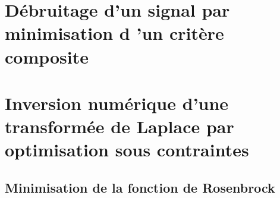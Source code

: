 \documentclass[12pt,a4paper,titlepage]{article}
\begin{document}
\section{Débruitage d’un signal par minimisation d ’un critère composite}

\newpage
\section{Inversion numérique d’une transformée de Laplace par optimisation sous contraintes}

\newpage

\begin{appendices}

    \section{Minimisation de la fonction de Rosenbrock}











\end{appendices}
\end{document}
